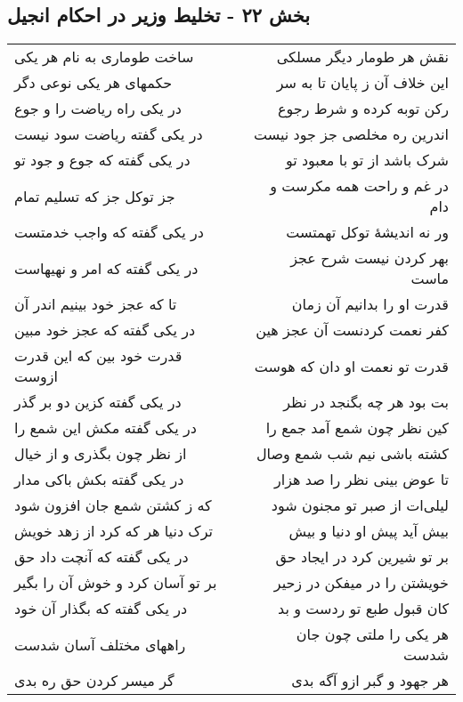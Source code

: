 \begin{center}
\section*{بخش ۲۲ - تخلیط وزیر در احکام انجیل}
\label{sec:sh022}
\begin{longtable}{l p{0.5cm} r}
ساخت طوماری به نام هر یکی
&&
نقش هر طومار دیگر مسلکی
\\
حکمهای هر یکی نوعی دگر
&&
این خلاف آن ز پایان تا به سر
\\
در یکی راه ریاضت را و جوع
&&
رکن توبه کرده و شرط رجوع
\\
در یکی گفته ریاضت سود نیست
&&
اندرین ره مخلصی جز جود نیست
\\
در یکی گفته که جوع و جود تو
&&
شرک باشد از تو با معبود تو
\\
جز توکل جز که تسلیم تمام
&&
در غم و راحت همه مکرست و دام
\\
در یکی گفته که واجب خدمتست
&&
ور نه اندیشهٔ توکل تهمتست
\\
در یکی گفته که امر و نهیهاست
&&
بهر کردن نیست شرح عجز ماست
\\
تا که عجز خود بینیم اندر آن
&&
قدرت او را بدانیم آن زمان
\\
در یکی گفته که عجز خود مبین
&&
کفر نعمت کردنست آن عجز هین
\\
قدرت خود بین که این قدرت ازوست
&&
قدرت تو نعمت او دان که هوست
\\
در یکی گفته کزین دو بر گذر
&&
بت بود هر چه بگنجد در نظر
\\
در یکی گفته مکش این شمع را
&&
کین نظر چون شمع آمد جمع را
\\
از نظر چون بگذری و از خیال
&&
کشته باشی نیم شب شمع وصال
\\
در یکی گفته بکش باکی مدار
&&
تا عوض بینی نظر را صد هزار
\\
که ز کشتن شمع جان افزون شود
&&
لیلی‌ات از صبر تو مجنون شود
\\
ترک دنیا هر که کرد از زهد خویش
&&
بیش آید پیش او دنیا و بیش
\\
در یکی گفته که آنچت داد حق
&&
بر تو شیرین کرد در ایجاد حق
\\
بر تو آسان کرد و خوش آن را بگیر
&&
خویشتن را در میفکن در زحیر
\\
در یکی گفته که بگذار آن خود
&&
کان قبول طبع تو ردست و بد
\\
راههای مختلف آسان شدست
&&
هر یکی را ملتی چون جان شدست
\\
گر میسر کردن حق ره بدی
&&
هر جهود و گبر ازو آگه بدی
\\

\end{longtable}
\end{center}
